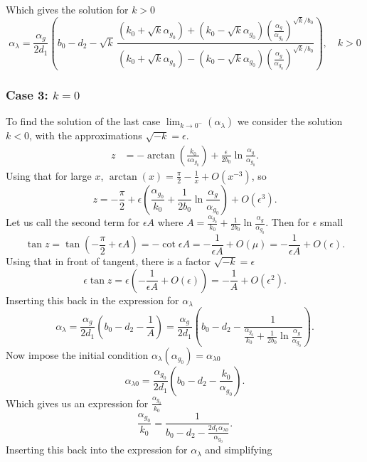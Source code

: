 Which gives the solution for $k>0$
\begin{equation}
    \boxed{\alpha_{\lambda} = \frac{\alpha_g}{2d_1} \left( b_0 - d_2 - \sqrt{k} \, \frac{ (k_0 + \sqrt{k}\alpha_{g_0}) + (k_0 - \sqrt{k}\alpha_{g_0}) \left( \frac{\alpha_g}{\alpha_{g_0}} \right)^{\sqrt{k}/b_0} }{ (k_0 + \sqrt{k}\alpha_{g_0}) - (k_0 - \sqrt{k}\alpha_{g_0}) \left( \frac{\alpha_g}{\alpha_{g_0}} \right)^{\sqrt{k}/b_0} } \right) , \quad k>0 }
    \label{eq:alphalamk>0}
\end{equation}

\subsubsection*{Case 3: $k = 0$}
To find the solution of the last case $\lim_{k \to 0^-}(\alpha_\lambda)$ we consider the solution $k<0$, with the approximations $\sqrt{-k} =\epsilon$.
\begin{align*}
z &= -\arctan\left( \frac{k_0}{\epsilon\alpha_{g_0}} \right) + \frac{\epsilon}{2b_0} \ln\frac{\alpha_g}{\alpha_{g_0}} .
\end{align*}
Using that for large $x$, $\arctan(x) = \frac{\pi}{2} - \frac{1}{x} + O(x^{-3})$, so
\[
z = -\frac{\pi}{2} +\epsilon\left( \frac{\alpha_{g_0}}{k_0} + \frac{1}{2b_0}\ln\frac{\alpha_g}{\alpha_{g_0}}\right) + O(\epsilon^3) .
\]
Let us call the second term for $\epsilon A$ where $A = \frac{\alpha_{g_0}}{k_0} + \frac{1}{2b_0}\ln\frac{\alpha_g}{\alpha_{g_0}}$. Then for $\epsilon$ small
\[
\tan z = \tan\left(-\frac{\pi}{2} + \epsilon A\right) = -\cot\epsilon A = -\frac{1}{\epsilon A} + O(\mu) = -\frac{1}{\epsilon A} + O(\epsilon) .
\]
Using that in front of tangent, there is a factor $\sqrt {-k}=\epsilon$
\[
\epsilon \tan z = \epsilon \left( -\frac{1}{\epsilon A} + O(\epsilon) \right) = -\frac{1}{A} + O(\epsilon^2) .
\]
Inserting this back in the expression for $\alpha_\lambda$
\[
\alpha_{\lambda} = \frac{\alpha_g}{2d_1} \left( b_0 - d_2 - \frac{1}{A} \right) = \frac{\alpha_g}{2d_1} \left( b_0 - d_2 - \frac{1}{ \frac{\alpha_{g_0}}{k_0} + \frac{1}{2b_0}\ln\frac{\alpha_g}{\alpha_{g_0}} } \right) .
\]
Now impose the initial condition $\alpha_{\lambda}(\alpha_{g_0}) = \alpha_{\lambda0}$
\[
\alpha_{\lambda0} = \frac{\alpha_{g_0}}{2d_1} \left( b_0 - d_2 - \frac{k_0}{\alpha_{g_0}} \right) .
\]
Which gives us an expression for $\frac{\alpha_{g_0}}{k_0}$
\[
\frac{\alpha_{g_0}}{k_0} = \frac{1}{b_0 - d_2 - \frac{2d_1\alpha_{\lambda0}}{\alpha_{g_0}}} .
\]
Inserting this back into the expression for $\alpha_\lambda$ and simplifying
